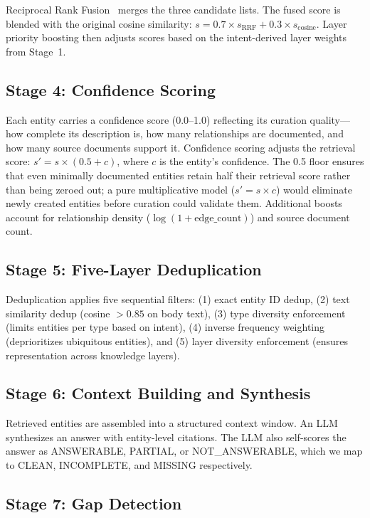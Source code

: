 \documentclass[11pt,a4paper]{article}
\begin{document}
Reciprocal Rank Fusion~\citep{cormack2009rrf} merges the three candidate lists. The fused score is blended with the original cosine similarity: $s = 0.7 \times s_{\text{RRF}} + 0.3 \times s_{\text{cosine}}$. Layer priority boosting then adjusts scores based on the intent-derived layer weights from Stage~1.

\subsection{Stage 4: Confidence Scoring}

Each entity carries a confidence score (0.0--1.0) reflecting its curation quality---how complete its description is, how many relationships are documented, and how many source documents support it. Confidence scoring adjusts the retrieval score: $s' = s \times (0.5 + c)$, where $c$ is the entity's confidence. The 0.5 floor ensures that even minimally documented entities retain half their retrieval score rather than being zeroed out; a pure multiplicative model ($s' = s \times c$) would eliminate newly created entities before curation could validate them. Additional boosts account for relationship density ($\log(1 + \text{edge\_count})$) and source document count.

\subsection{Stage 5: Five-Layer Deduplication}

Deduplication applies five sequential filters: (1) exact entity ID dedup, (2) text similarity dedup (cosine $> 0.85$ on body text), (3) type diversity enforcement (limits entities per type based on intent), (4) inverse frequency weighting (deprioritizes ubiquitous entities), and (5) layer diversity enforcement (ensures representation across knowledge layers).

\subsection{Stage 6: Context Building and Synthesis}

Retrieved entities are assembled into a structured context window. An LLM synthesizes an answer with entity-level citations. The LLM also self-scores the answer as ANSWERABLE, PARTIAL, or NOT\_ANSWERABLE, which we map to CLEAN, INCOMPLETE, and MISSING respectively.

\subsection{Stage 7: Gap Detection}
\end{document}
